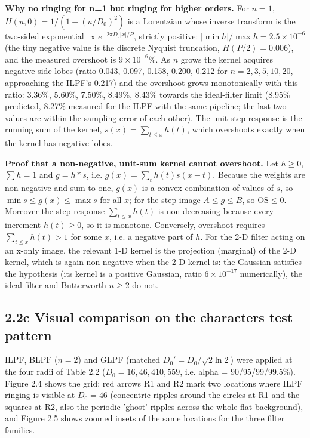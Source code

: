 \documentclass[10pt,a4paper]{article}
\begin{document}
\textbf{Why no ringing for n=1 but ringing for higher orders.} For $n=1$, $H(u,0)=1/(1+(u/D_0)^2)$ is a Lorentzian whose inverse transform is the two-sided exponential $\propto e^{-2\pi D_0|x|/P}$, strictly positive: $|\min h|/\max h=2.5\times10^{-6}$ (the tiny negative value is the discrete Nyquist truncation, $H(P/2)=0.006$), and the measured overshoot is $9\times10^{-6}$\%. As $n$ grows the kernel acquires negative side lobes (ratio 0.043, 0.097, 0.158, 0.200, 0.212 for $n=2,3,5,10,20$, approaching the ILPF's 0.217) and the overshoot grows monotonically with this ratio: 3.36\%, 5.60\%, 7.50\%, 8.49\%, 8.43\% towards the ideal-filter limit (8.95\% predicted, 8.27\% measured for the ILPF with the same pipeline; the last two values are within the sampling error of each other). The unit-step response is the running sum of the kernel, $s(x)=\sum_{t\le x}h(t)$, which overshoots exactly when the kernel has negative lobes.

\textbf{Proof that a non-negative, unit-sum kernel cannot overshoot.} Let $h\ge0$, $\sum h=1$ and $g=h\ast s$, i.e. $g(x)=\sum_t h(t)s(x-t)$. Because the weights are non-negative and sum to one, $g(x)$ is a convex combination of values of $s$, so $\min s\le g(x)\le\max s$ for all $x$; for the step image $A\le g\le B$, so $\mathrm{OS}\le0$. Moreover the step response $\sum_{t\le x}h(t)$ is non-decreasing because every increment $h(t)\ge0$, so it is monotone. Conversely, overshoot requires $\sum_{t\le x}h(t)>1$ for some $x$, i.e. a negative part of $h$. For the 2-D filter acting on an x-only image, the relevant 1-D kernel is the projection (marginal) of the 2-D kernel, which is again non-negative when the 2-D kernel is: the Gaussian satisfies the hypothesis (its kernel is a positive Gaussian, ratio $6\times10^{-17}$ numerically), the ideal filter and Butterworth $n\ge2$ do not.

\subsection{2.2c Visual comparison on the characters test pattern}
ILPF, BLPF ($n=2$) and GLPF (matched $D_0'=D_0/\sqrt{2\ln2}$) were applied at the four radii of Table 2.2 ($D_0=16, 46, 410, 559$, i.e. alpha = 90/95/99/99.5\%). Figure 2.4 shows the grid; red arrows R1 and R2 mark two locations where ILPF ringing is visible at $D_0=46$ (concentric ripples around the circles at R1 and the squares at R2, also the periodic 'ghost' ripples across the whole flat background), and Figure 2.5 shows zoomed insets of the same locations for the three filter families.
\end{document}
